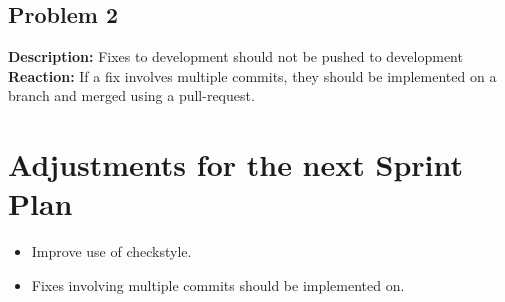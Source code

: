\documentclass[10pt]{article}
\begin{document}
\subsection*{Problem 2}
\textbf{Description:}
Fixes to development should not be pushed to development\\
\textbf{Reaction:} 
If a fix involves multiple commits, they should be implemented on a branch and merged using a pull-request.

\section*{Adjustments for the next Sprint Plan}
\begin{itemize}
\item Improve use of checkstyle.
\item Fixes involving multiple commits should be implemented on. 
\end{itemize}
\end{document}
